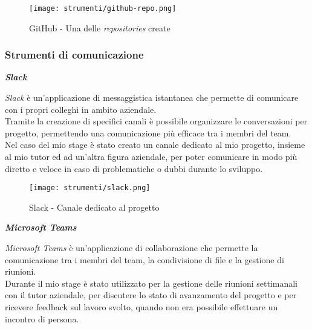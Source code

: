 \begin{figure}[H]
    \label{fig:github} 
    \centering
    \texttt{[image: strumenti/github-repo.png]}
    \caption{GitHub - Una delle \textit{repositories} create}
\end{figure}

\pagebreak
\subsubsection{Strumenti di comunicazione}
\label{sez:strumenti-comunicazione}


\noindent \textbf{\textit{Slack\\}}

\noindent \textit{Slack} è un'applicazione di messaggistica istantanea che permette di comunicare con i propri colleghi in ambito aziendale. \\
Tramite la creazione di specifici canali è possibile organizzare le conversazioni per progetto, permettendo una comunicazione più efficace tra i membri del team.\\
Nel caso del mio stage è stato creato un canale dedicato al mio progetto, insieme al mio tutor ed ad un'altra figura aziendale, per poter comunicare in modo più diretto e veloce 
in caso di problematiche o dubbi durante lo sviluppo.

\begin{figure}[H]
    \label{fig:slack} 
    \centering
    \texttt{[image: strumenti/slack.png]}
    \caption{Slack - Canale dedicato al progetto}
\end{figure}

\noindent \textbf{\textit{Microsoft Teams\\}}

\noindent \textit{Microsoft Teams} è un'applicazione di collaborazione che permette la comunicazione tra i membri del team, la condivisione di file e la gestione di riunioni.\\
Durante il mio stage è stato utilizzato per la gestione delle riunioni settimanali con il tutor aziendale, per discutere lo stato di avanzamento del progetto e per ricevere feedback sul lavoro svolto, quando
non era possibile effettuare un incontro di persona.
